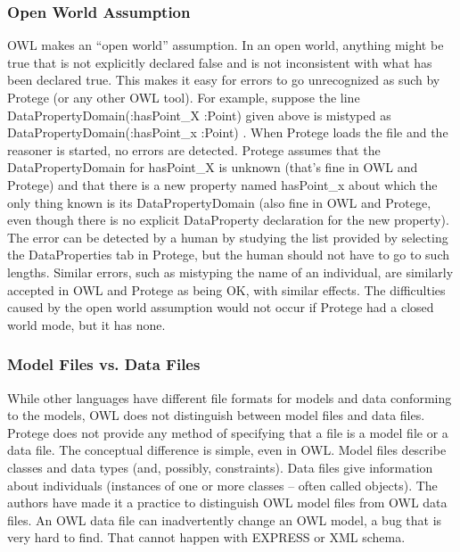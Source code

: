 \subsubsection{Open World Assumption}

OWL makes an ``open world'' assumption.  In an open world, anything might
be true that is not explicitly declared false and is not inconsistent with
what has been declared true. This makes it easy for errors to go
unrecognized as such by Protege (or any other OWL tool). For example,
suppose the line \sf DataPropertyDomain(:hasPoint\_X :Point) \rm given
above is mistyped as \sf DataPropertyDomain(:hasPoint\_x :Point) \rm. When
Protege loads the file and the reasoner is started, no errors are
detected. Protege assumes that the DataPropertyDomain for \sf hasPoint\_X
\rm is unknown (that's fine in OWL and Protege) and that there is a new
property named \sf hasPoint\_x \rm about which the only thing known is its
DataPropertyDomain (also fine in OWL and Protege, even though there is no
explicit DataProperty declaration for the new property). The error can be
detected by a human by studying the list provided by selecting the
DataProperties tab in Protege, but the human should not have to go to such
lengths. Similar errors, such as mistyping the name of an individual, are
similarly accepted in OWL and Protege as being OK, with similar effects.
The difficulties caused by the open world assumption would not occur if
Protege had a closed world mode, but it has none.\\

\subsubsection{Model Files vs. Data Files}

While other languages have different file formats for models and
data conforming to the models, OWL does not distinguish between model files
and data files. Protege does not provide any method of specifying that a
file is a model file or a data file. The conceptual difference is simple,
even in OWL. Model files describe classes and data types (and, possibly,
constraints). Data files give information about individuals (instances of
one or more classes -- often called objects). The authors have made it a
practice to distinguish OWL model files from OWL data files. An OWL data
file can inadvertently change an OWL model, a bug that is very hard to
find. That cannot happen with EXPRESS or XML schema.\\

